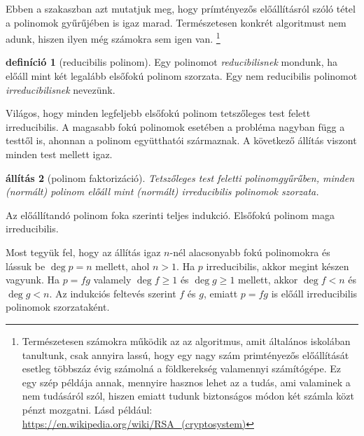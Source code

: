 \documentclass[9pt, a4paper, showtrims]{memoir}
\makeatletter
\renewenvironment{proof}[1][\proofname]
    {\par\pushQED{\qed}%
    \normalfont \topsep6\p@\@plus6\p@\relax
    \trivlist
    \item[\hskip\labelsep
        \itshape
    #1\@addpunct{:}]\ignorespaces}
    {\popQED\endtrivlist\@endpefalse}
\theoremstyle{plain}
\newtheorem{proposition}{állítás}[chapter]
\theoremstyle{remark}
\theoremstyle{definition}
\newtheorem{definition}[proposition]{definíció}
\makeatother
\begin{document}
Ebben a szakaszban azt mutatjuk meg, hogy prímtényezős előállításról szóló tétel a polinomok gyűrűjében is igaz marad.
Természetesen konkrét algoritmust nem adunk, hiszen ilyen még számokra sem igen van.%
\footnote{Természetesen számokra működik az az algoritmus, amit általános iskolában tanultunk,
	csak annyira lassú, hogy egy nagy szám primtényezős előállítását esetleg többszáz évig számolná a földkerekség valamennyi számítógépe.
	Ez egy szép példája annak,
	mennyire hasznos lehet az a tudás,
	ami valaminek a nem tudásáról szól,
	hiszen
	emiatt tudunk biztonságos módon két számla közt pénzt mozgatni.
	Lásd például: \url{https://en.wikipedia.org/wiki/RSA_(cryptosystem)}}
\begin{definition}[reducibilis polinom]
	Egy polinomot \emph{reducibilisnek} mondunk,
	ha előáll mint két legalább elsőfokú polinom szorzata.
	Egy nem reducibilis polinomot \emph{irreducibilisnek} nevezünk.
\end{definition}
Világos, hogy minden legfeljebb elsőfokú polinom tetszőleges test felett irreducibilis.
A magasabb fokú polinomok esetében a probléma nagyban függ a testtől is,
ahonnan a polinom együtthatói származnak.
A következő állítás viszont minden test mellett igaz.
\begin{proposition}[polinom faktorizáció]\label{pr:polfact}
	Tetszőleges test feletti polinomgyűrűben,
	minden (normált) polinom előáll mint (normált) irreducibilis polinomok szorzata.
\end{proposition}
\begin{proof}
	Az előállítandó polinom foka szerinti teljes indukció.
	Elsőfokú polinom maga irreducibilis.

	Most tegyük fel, hogy az állítás igaz $n$-nél alacsonyabb fokú polinomokra
	és lássuk be $\deg p=n$ mellett, ahol $n>1$.
	Ha $p$ irreducibilis, akkor megint készen vagyunk.
	Ha $p=f g$ valamely $\deg f\geq 1$ és $\deg g\geq 1$ mellett,
	akkor $\deg f<n$ és $\deg g<n$.
	Az indukciós feltevés szerint $f$ és $g$, emiatt $p=fg$ is előáll irreducibilis polinomok szorzataként.
\end{proof}
\end{document}
